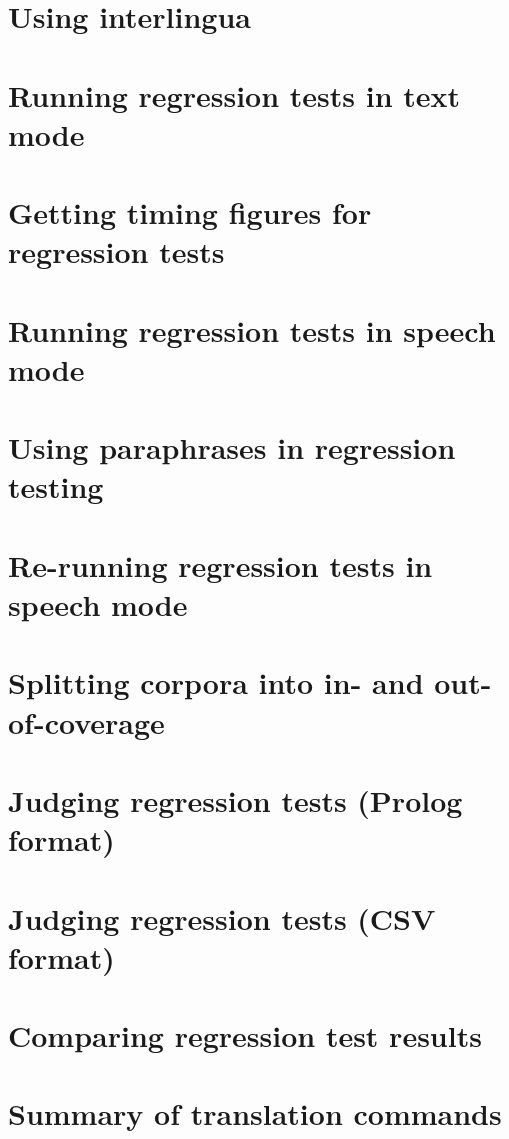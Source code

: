 \section{Using interlingua}
\label{Section:Interlingua}

\section{Running regression tests in text mode}
\label{Section:TranslationRegressionText}

\section{Getting timing figures for regression tests}
\label{Section:TranslationRegressionTextTimes}

\section{Running regression tests in speech mode}
\label{Section:TranslationRegressionSpeech}

\section{Using paraphrases in regression testing}
\label{Section:TranslationRegressionParaphrases}

\section{Re-running regression tests in speech mode}
\label{Section:TranslationRegressionSpeechRerun}

\section{Splitting corpora into in- and out-of-coverage}
\label{Section:SplittingCorpora}

\section{Judging regression tests (Prolog format)}
\label{Section:TranslationJudgingProlog}

\section{Judging regression tests (CSV format)}
\label{Section:TranslationJudgingCSV}

\section{Comparing regression test results}
\label{Section:TranslationBatchComparisons}

\section{Summary of translation commands}
\label{Section:TranslationCommandSummary}

